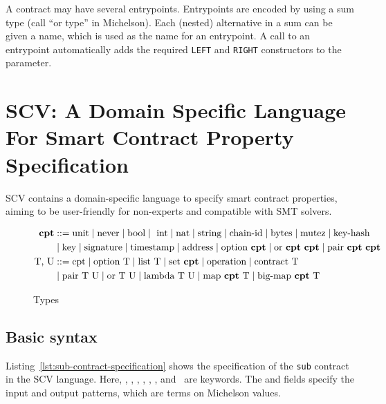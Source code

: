 \documentclass[runningheads]{llncs}
\begin{document}
A contract may have several entrypoints. Entrypoints are encoded by
using a sum type (call ``or type'' in Michelson). Each (nested) alternative in a sum can be
given a name, which is used as the name for an entrypoint. A call to
an entrypoint automatically adds the required \lstinline|LEFT| and
\lstinline|RIGHT| constructors to the parameter.
\lstset{language=Caml}
\section{SCV: A Domain Specific Language For Smart Contract Property Specification}
\label{sec:domain-specific-language}
SCV contains a domain-specific language to specify smart contract properties, aiming to be user-friendly for non-experts and compatible with SMT solvers. 
\begin{figure}[tp]
\begin{align*}
\textbf{cpt} &::= 
   \text{unit} 
   \mid\text{never} 
   \mid\text{bool} 
   \mid\ \text{int}
   \mid\text{nat}
   \mid\text{string}
   \mid\text{chain-id} 
    \mid\text{bytes}
   \mid\text{mutez} 
   \mid\text{key-hash} \\
   &\mid\text{key}
   \mid \text{signature}
   \mid \text{timestamp} 
   \mid \text{address} 
   \mid \text{option}\ \textbf{cpt}
   \mid \text{or}\ \textbf{cpt}\ \textbf{cpt}
   \mid \text{pair}\ \textbf{cpt}\ \textbf{cpt} \\
\text{T, U} &::= 
    \text{cpt}
   \mid \text{option}\ \text{T}
   \mid \text{list}\ \text{T}
   \mid \text{set}\ \textbf{cpt} 
   \mid \text{operation} 
   \mid \text{contract}\ \text{T} \\
  & \mid \text{pair}\ \text{T}\ \text{U}
   \mid \text{or}\ \text{T}\ \text{U}
   \mid \text{lambda}\ \text{T}\ \text{U} 
   \mid \text{map}\ \textbf{cpt}\ \text{T}
   \mid \text{big-map}\ \textbf{cpt}\ \text{T}
\end{align*}
\caption{Types}
\label{fig:types}
\end{figure}
\subsection{Basic syntax}
\label{sec:basic-syntax}
Listing~\ref{lst:sub-contract-specification} shows the specification of the \texttt{sub} contract in the SCV language. Here, \KMCONTRACT, \KSPEC, \KCODE, \KINPUT, \KOUTPUT, \KPRECONDI, and \KPOSTCONDI\ are keywords. The \KINPUT{} and \KOUTPUT{} fields specify the input and output patterns, which are terms on Michelson values.
\end{document}
